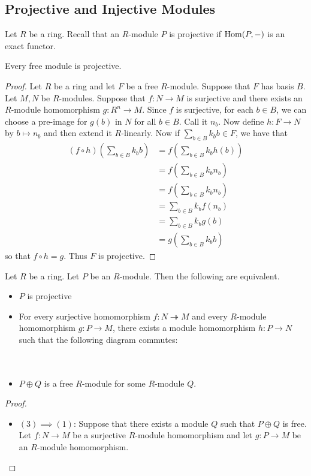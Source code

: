 \documentclass[a4paper]{article}
\begin{document}
\subsection{Projective and Injective Modules}
Let $R$ be a ring. Recall that an $R$-module $P$ is projective if $\operatorname{Hom}(P,-)$ is an exact functor. 

\begin{lmm}{}{} Every free module is projective. \tcbline
\begin{proof}
Let $R$ be a ring and let $F$ be a free $R$-module. Suppose that $F$ has basis $B$. Let $M,N$ be $R$-modules. Suppose that $f:N\to M$ is surjective and there exists an $R$-module homomorphism $g:R^n\to M$. Since $f$ is surjective, for each $b\in B$, we can choose a pre-image for $g(b)$ in $N$ for all $b\in B$. Call it $n_b$. Now define $h:F\to N$ by $b\mapsto n_b$ and then extend it $R$-linearly. Now if $\sum_{b\in B}k_bb\in F$, we have that 
\begin{align*}
(f\circ h)\left(\sum_{b\in B}k_bb\right)&=f\left(\sum_{b\in B}k_bh(b)\right)\\
&=f\left(\sum_{b\in B}k_bn_b\right)\\
&=f\left(\sum_{b\in B}k_bn_b\right)\\
&=\sum_{b\in B}k_bf(n_b)\\
&=\sum_{b\in B}k_bg(b)\\
&=g\left(\sum_{b\in B}k_bb\right)
\end{align*}
so that $f\circ h=g$. Thus $F$ is projective. 
\end{proof}
\end{lmm}

\begin{prp}{}{} Let $R$ be a ring. Let $P$ be an $R$-module. Then the following are equivalent. 
\begin{itemize}
\item $P$ is projective 
\item For every surjective homomorphism $f:N\twoheadrightarrow M$ and every $R$-module homomorphism $g:P\to M$, there exists a module homomorphism $h:P\to N$ such that the following diagram commutes: \\~\\
 \\
\item $P\oplus Q$ is a free $R$-module for some $R$-module $Q$. 
\end{itemize} \tcbline
\begin{proof}~\\
\begin{itemize}
\item $(3)\implies(1)$: Suppose that there exists a module $Q$ such that $P\oplus Q$ is free. Let $f:N\to M$ be a surjective $R$-module homomorphism and let $g:P\to M$ be an $R$-module homomorphism. 
\end{itemize}
\end{proof}
\end{prp}
\end{document}
